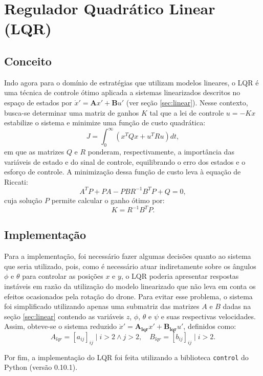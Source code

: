 \section{Regulador Quadrático Linear (LQR)}
\subsection{Conceito}
Indo agora para o domínio de estratégias que utilizam modelos lineares, o LQR é uma técnica de 
controle ótimo aplicada a sistemas linearizados descritos no espaço de estados por $\dot{x}' = 
\mathbf{A} x' + \mathbf{B} u'$ (ver seção \ref{sec:linear}). 
Nesse contexto, busca-se determinar uma matriz de ganhos $K$ tal que a lei de controle $u = -Kx$ 
estabilize o sistema e minimize uma função de custo quadrática:
\begin{equation}
    J = \int_0^\infty (x^T Q x + u^T R u) dt,
    \label{eq:custo_lqr}
\end{equation}
\noindent  em que as matrizes $Q$ e $R$ ponderam, respectivamente, a importância das variáveis de 
estado e do sinal de controle, equilibrando o erro dos estados e o esforço de controle. A 
minimização dessa função de custo leva à equação de Riccati: 
\begin{equation}
    A^T P + PA - PBR^{-1}B^TP + Q = 0,
\end{equation}
\noindent cuja solução $P$ permite calcular o ganho ótimo por:
\begin{equation}
    K = R^{-1}B^TP.
\end{equation}

\subsection{Implementação}
Para a implementação, foi necessário fazer algumas decisões quanto ao sistema que seria utilizado, 
pois, como é necessário atuar indiretamente sobre os ângulos $\phi$ e $\theta$ para controlar as 
posições $x$ e $y$, o LQR poderia apresentar respostas instáveis em razão da utilização do modelo 
linearizado que não leva em conta os efeitos ocasionados pela rotação do drone. Para evitar 
esse problema, o sistema foi simplificado utilizando apenas uma submatriz das matrizes $A$ e $B$ 
dadas na seção \ref{sec:linear} contendo as variáveis $z$, $\phi$, $\theta$ e $\psi$ e suas 
respectivas velocidades. Assim, obteve-se o sistema reduzido $\dot{x}' = 
\mathbf{A_{lqr}} x' + \mathbf{B_{lqr}} u'$, definidos como:
\begin{equation}
    A_{lqr} = [a_{ij}]_{ij} \mid i > 2 \land j > 2, \quad B_{lqr} = [b_{ij}]_{ij} \mid i > 2.
\end{equation}

Por fim, a implementação do LQR foi feita utilizando a biblioteca \texttt{control} do Python 
(versão 0.10.1).

